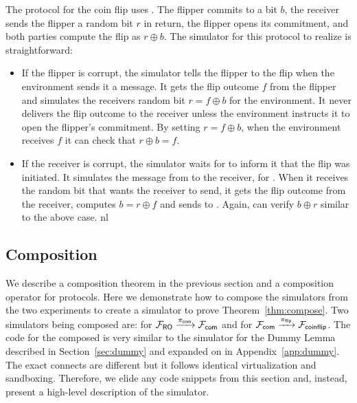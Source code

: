 The protocol for the coin flip uses \Fcom. 
The flipper commits to a bit $b$, the receiver sends the flipper a random bit $r$ in return, the flipper opens its commitment, and both parties compute the flip as $r \oplus b$.
The simulator for this protocol to realize \Fflip is straightforward:
\begin{itemize}
\item If the flipper is corrupt, the simulator tells the flipper to  the flip when the environment sends it a  message. It gets the flip outcome $f$ from the flipper and simulates the receivers random bit $r = f \oplus b$ for the environment. It never delivers the flip outcome to the receiver unless the environment instructs it to open the flipper's commitment. By setting $r = f \oplus b$, when the environment receives $f$ it can check that $r \oplus b = f$.
\item If the receiver is corrupt, the simulator waits for \Fflip to inform it that the flip was initiated. It simulates the  message from \Fcom to the receiver, for \Z. When it receives the random bit that \Z wants the receiver to send, it gets the flip outcome from the receiver, computes $b = r \oplus f$ and sends  to \Z. Again, \Z can verify $b \oplus r$ similar to the above case.
nl
\end{itemize}

\subsection{Composition}
We describe a composition theorem in the previous section and a composition operator for protocols.
Here we demonstrate how to compose the simulators from the two experiments to create a simulator to prove Theorem~\ref{thm:compose}.
Two simulators being composed are:  for $\mathcal{F}_{{\mathsf {RO}}} \xrightarrow{\pi_{{\mathsf {com}}}} \mathcal{F}_{{\mathsf {com}}}$ and  for $\mathcal{F}_{{\mathsf {com}}} \xrightarrow{\pi_{{\mathsf {flip}}}} \mathcal{F}_{{\mathsf {coinflip}}}$. 
The code for the composed is very similar to the simulator for the Dummy Lemma described in Section~\ref{sec:dummy} and expanded on in Appendix~\ref{app:dummy}.
The exact connects are different but it follows identical virtualization and sandboxing.
Therefore, we elide any code snippets from this section and, instead, present a high-level description of the simulator.

